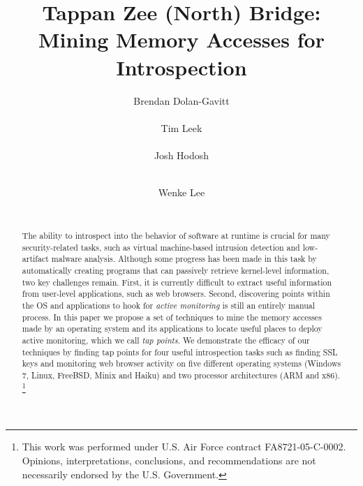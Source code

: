 \documentclass{sig-alternate-2013}
\begin{document}
\date{}

\title{Tappan Zee (North) Bridge: Mining Memory Accesses for Introspection}


\author{
\alignauthor
Brendan Dolan-Gavitt\\
    \\
\alignauthor
Tim Leek\\
    \\
\alignauthor
Josh Hodosh\\
    \\
\and
\alignauthor
Wenke Lee\\
    \\
} %

\maketitle

\thispagestyle{empty}

\begin{abstract}

The ability to introspect into the behavior of software at runtime is
crucial for many security-related tasks, such as virtual machine-based
intrusion detection and low-artifact malware analysis. Although some
progress has been made in this task by automatically creating programs
that can passively retrieve kernel-level information, two key challenges
remain. First, it is currently difficult to extract useful information
from user-level applications, such as web browsers. Second, discovering
points within the OS and applications to hook for \emph{active
monitoring} is still an entirely manual process. In this paper we
propose a set of techniques to mine the memory accesses made by an
operating system and its applications to locate useful places to deploy
active monitoring, which we call \emph{tap points}. We demonstrate the
efficacy of our techniques by finding tap points for four useful
introspection tasks such as finding SSL keys and monitoring web browser
activity on five different operating systems (Windows 7, Linux, FreeBSD,
Minix and Haiku) and two processor architectures (ARM and x86).
\footnote{This work was performed under U.S. Air Force contract
FA8721-05-C-0002. Opinions, interpretations, conclusions, and
recommendations are not necessarily endorsed by the U.S. Government.}

\end{abstract}
\end{document}
